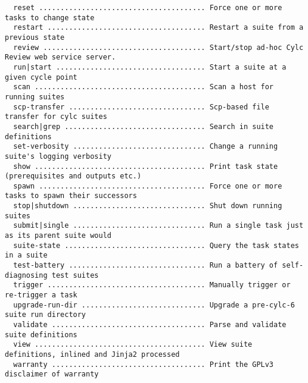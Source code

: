 \begin{lstlisting}
  reset ....................................... Force one or more tasks to change state
  restart ..................................... Restart a suite from a previous state
  review ...................................... Start/stop ad-hoc Cylc Review web service server.
  run|start ................................... Start a suite at a given cycle point
  scan ........................................ Scan a host for running suites
  scp-transfer ................................ Scp-based file transfer for cylc suites
  search|grep ................................. Search in suite definitions
  set-verbosity ............................... Change a running suite's logging verbosity
  show ........................................ Print task state (prerequisites and outputs etc.)
  spawn ....................................... Force one or more tasks to spawn their successors
  stop|shutdown ............................... Shut down running suites
  submit|single ............................... Run a single task just as its parent suite would
  suite-state ................................. Query the task states in a suite
  test-battery ................................ Run a battery of self-diagnosing test suites
  trigger ..................................... Manually trigger or re-trigger a task
  upgrade-run-dir ............................. Upgrade a pre-cylc-6 suite run directory
  validate .................................... Parse and validate suite definitions
  view ........................................ View suite definitions, inlined and Jinja2 processed
  warranty .................................... Print the GPLv3 disclaimer of warranty
\end{lstlisting}
